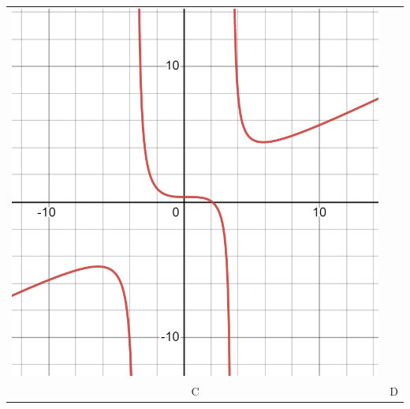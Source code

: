 \documentclass{ximera}
\begin{document}
\begin{exercise}
\begin{center}
\begin{tabular}{cc}
			\includegraphics[width=0.49\linewidth]{RF17-4.png} \\
			C & D\\
		\end{tabular}
	\end{center}

\end{exercise}
\end{document}
